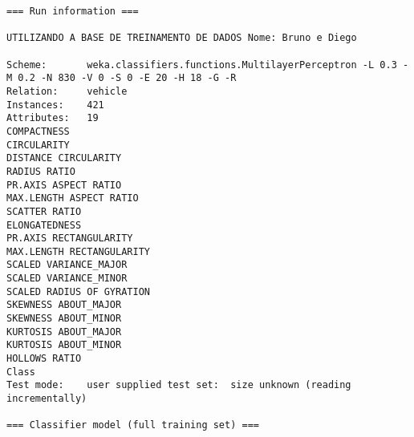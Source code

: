 \documentclass[
	article,			%
	11pt,				%
	oneside,			%
	a4paper,			%
	english,			%
	brazil,				%
	sumario=tradicional
	]{abntex2}
\begin{document}
\begin{lstlisting}
=== Run information ===

UTILIZANDO A BASE DE TREINAMENTO DE DADOS Nome: Bruno e Diego

Scheme:       weka.classifiers.functions.MultilayerPerceptron -L 0.3 -M 0.2 -N 830 -V 0 -S 0 -E 20 -H 18 -G -R
Relation:     vehicle
Instances:    421
Attributes:   19
COMPACTNESS
CIRCULARITY
DISTANCE CIRCULARITY
RADIUS RATIO
PR.AXIS ASPECT RATIO
MAX.LENGTH ASPECT RATIO
SCATTER RATIO
ELONGATEDNESS
PR.AXIS RECTANGULARITY
MAX.LENGTH RECTANGULARITY
SCALED VARIANCE_MAJOR
SCALED VARIANCE_MINOR
SCALED RADIUS OF GYRATION
SKEWNESS ABOUT_MAJOR
SKEWNESS ABOUT_MINOR
KURTOSIS ABOUT_MAJOR
KURTOSIS ABOUT_MINOR
HOLLOWS RATIO
Class
Test mode:    user supplied test set:  size unknown (reading incrementally)

=== Classifier model (full training set) ===


\end{lstlisting}
\end{document}

